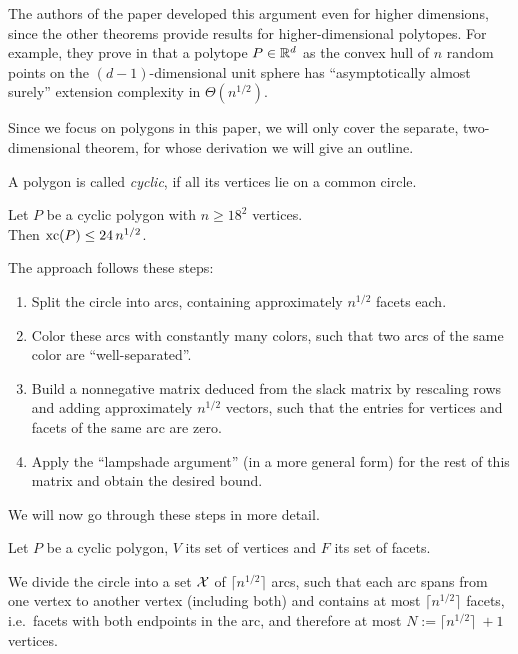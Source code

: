 The authors of the paper developed this argument even for higher dimensions, since the other theorems provide results for higher-dimensional polytopes. For example, they prove in \cite[Theorem 1.1]{shitov2020sublinear} that a polytope $P \in \mathbb{R}^d$ as the convex hull of $n$ random points on the $(d-1)$-dimensional unit sphere has ``asymptotically almost surely'' extension complexity in $\Theta(n^{1/2})$.

Since we focus on polygons in this paper, we will only cover the separate, two-dimensional theorem, for whose derivation we will give an outline.

\begin{definition}
  A polygon is called \emph{cyclic}, if all its vertices lie on a common circle.
\end{definition}

\begin{theorem}\label{theorem:cyclic-xc}
  Let $P$ be a cyclic polygon with $n \geq 18^2$ vertices.\\
  Then $\operatorname{xc}(P) \leq 24\,n^{1/2}$.
\end{theorem}

The approach follows these steps:

\begin{enumerate}
  \item Split the circle into arcs, containing approximately $n^{1/2}$ facets each.
  \item Color these arcs with constantly many colors, such that two arcs of the same color are ``well-separated''.
  \item Build a nonnegative matrix deduced from the slack matrix by rescaling rows and adding approximately $n^{1/2}$ vectors, such that the entries for vertices and facets of the same arc are zero.
  \item Apply the ``lampshade argument'' (in a more general form) for the rest of this matrix and obtain the desired bound.
\end{enumerate}

We will now go through these steps in more detail.

Let $P$ be a cyclic polygon, $V$ its set of vertices and $F$ its set of facets.

We divide the circle into a set $\mathcal{X}$ of $\lceil n^{1/2} \rceil$ arcs, such that each arc spans from one vertex to another vertex (including both) and contains at most $\lceil n^{1/2} \rceil$ facets, i.e.\ facets with both endpoints in the arc, and therefore at most $N := \lceil n^{1/2} \rceil\ + 1$ vertices.

